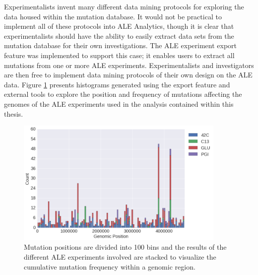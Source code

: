 \documentclass[12pt,final,masters,chapterheads]{ucsd}  %
\begin{document}
Experimentalists invent many different data mining protocols for exploring the data housed within the mutation database. It would not be practical to implement all of these protocols into ALE Analytics, though it is clear that experimentalists should have the ability to easily extract data sets from the mutation database for their own investigations. The ALE experiment export feature was implemented to support this case; it enables users to extract all mutations from one or more ALE experiments. Experimentalists and investigators are then free to implement data mining protocols of their own design on the ALE data. Figure \ref{fig:all_muts_topo} presents histograms generated using the export feature and external tools to explore the position and frequency of mutations affecting the genomes of the ALE experiments used in the analysis contained within this thesis.
\begin{figure}[H]
  \centering
  \includegraphics[width=0.9\textwidth]{all_muts_topo.png}
  \caption[A histogram of all mutation positions contained within the instance of ALE Analytics used to accomplish the analysis contained within this thesis.]{ Mutation positions are divided into 100 bins and the results of the different ALE experiments involved are stacked to visualize the cumulative mutation frequency within a genomic region.}
  \label{fig:all_muts_topo}
\end{figure}
\end{document}
